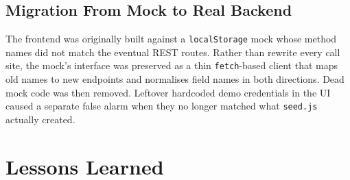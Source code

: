 \documentclass[11pt,letterpaper]{article}
\begin{document}
\subsection{Migration From Mock to Real Backend}

The frontend was originally built against a \texttt{localStorage} mock whose
method names did not match the eventual REST routes. Rather than rewrite every
call site, the mock's interface was preserved as a thin \texttt{fetch}-based
client that maps old names to new endpoints and normalises field names in both
directions. Dead mock code was then removed. Leftover hardcoded demo
credentials in the UI caused a separate false alarm when they no longer matched
what \texttt{seed.js} actually created.

\section{Lessons Learned}
\end{document}
